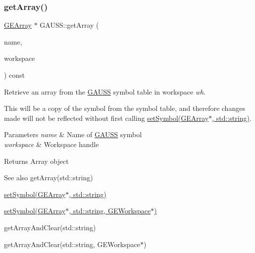 \subsubsection{\texorpdfstring{get\+Array()}{getArray()}\hspace{0.1cm}{\footnotesize\ttfamily [2/2]}}
{\footnotesize\ttfamily \hyperlink{class_g_e_array}{G\+E\+Array} $\ast$ G\+A\+U\+S\+S\+::get\+Array (\begin{DoxyParamCaption}\item[{std\+::string}]{name,  }\item[{\hyperlink{class_g_e_workspace}{G\+E\+Workspace} $\ast$}]{workspace }\end{DoxyParamCaption}) const}



Retrieve an array from the \hyperlink{class_g_a_u_s_s}{G\+A\+U\+SS} symbol table in workspace {\itshape wh}. 

This will be a copy of the symbol from the symbol table, and therefore changes made will not be reflected without first calling \hyperlink{class_g_a_u_s_s_a328c6fadd097c46b0651d1985c12759d}{set\+Symbol(\+G\+E\+Array$\ast$, std\+::string)}.


\begin{DoxyParams}{Parameters}
{\em name} & Name of \hyperlink{class_g_a_u_s_s}{G\+A\+U\+SS} symbol \\
\hline
{\em workspace} & Workspace handle \\
\hline
\end{DoxyParams}
\begin{DoxyReturn}{Returns}
Array object
\end{DoxyReturn}
\begin{DoxySeeAlso}{See also}
get\+Array(std\+::string) 

\hyperlink{class_g_a_u_s_s_a328c6fadd097c46b0651d1985c12759d}{set\+Symbol(\+G\+E\+Array$\ast$, std\+::string)} 

\hyperlink{class_g_a_u_s_s_a0b47905610cb724bd9d6b69ef57ddc60}{set\+Symbol(\+G\+E\+Array$\ast$, std\+::string, G\+E\+Workspace$\ast$)} 

get\+Array\+And\+Clear(std\+::string) 

get\+Array\+And\+Clear(std\+::string, G\+E\+Workspace$\ast$) 
\end{DoxySeeAlso}
\mbox{\label{class_g_a_u_s_s_a0d16f5307a11de5f943106df131a0d3c}} 
